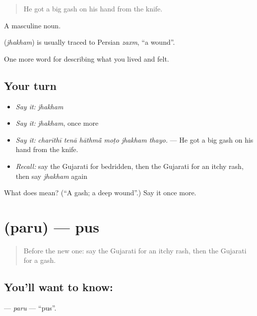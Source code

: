 \begin{quote}
He got a big gash on his hand from the knife.
\end{quote}

A masculine noun.

\begin{cousinweb}
\textbf{} (\emph{jhakham}) is usually traced to Persian \emph{zaxm}, \textquotedblleft{}a wound\textquotedblright{}.
\end{cousinweb}

\begin{grammarlens}[title={What you've built}]
One more word for describing what you lived and felt.
\end{grammarlens}

\subsection*{Your turn}
\begin{itemize}
\raggedright
  \item \emph{Say it:} \emph{jhakham}
  \item \emph{Say it:} \emph{jhakham}, once more
  \item \emph{Say it:} \emph{charīthī tenā hāthmā̃ moṭo jhakham thayo.} — He got a big gash on his hand from the knife.
  \item \emph{Recall:} say the Gujarati for bedridden, then the Gujarati for an itchy rash, then say \emph{jhakham} again
\end{itemize}

\begin{tcolorbox}[breakable,colback=teal!4,colframe=teal!35!black,title={Before you move on}]
What does  mean? (\textquotedblleft{}A gash; a deep wound\textquotedblright{}.) Say it once more.
\end{tcolorbox}
\section[\texorpdfstring{\gu{પરુ} (paru)}{પરુ (paru)}]{ (paru) — pus}

\label{lesson:GU-C480-paru}



\begin{quote}
Before the new one: say the Gujarati for an itchy rash, then the Gujarati for a gash.
\end{quote}

\subsection*{You'll want to know: }
\textbf{} — \emph{paru} — \textquotedblleft{}pus\textquotedblright{}.

